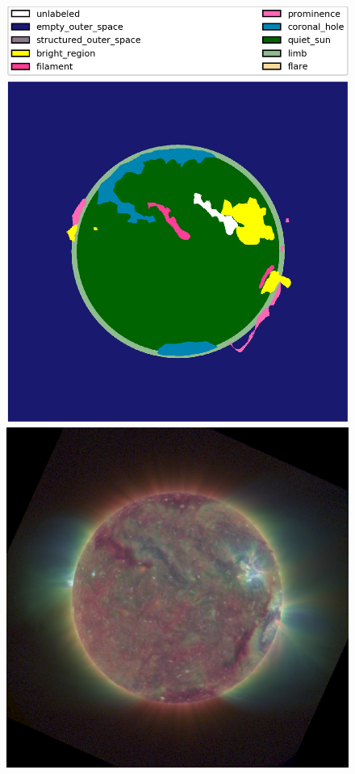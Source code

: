 \documentclass[twoside]{report}
\begin{document}
\begin{figure}[H]
  \begin{center}
    \includegraphics[scale=0.1]{g20171102000206-0}
    \includegraphics[scale=0.35]{g20171102000206}

\end{center}
\end{figure}
\end{document}

